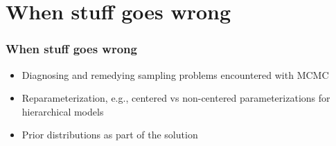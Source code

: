 \documentclass[handout]{beamer}
\begin{document}


  


\section{When stuff goes wrong}

\begin{frame}
  \frametitle{When stuff goes wrong}
  
  \begin{itemize}
  \item Diagnosing and remedying sampling problems encountered with MCMC
\item Reparameterization, e.g., centered vs non-centered parameterizations for hierarchical models
\item Prior distributions as part of the solution
  \end{itemize}

\end{frame}
\end{document}
